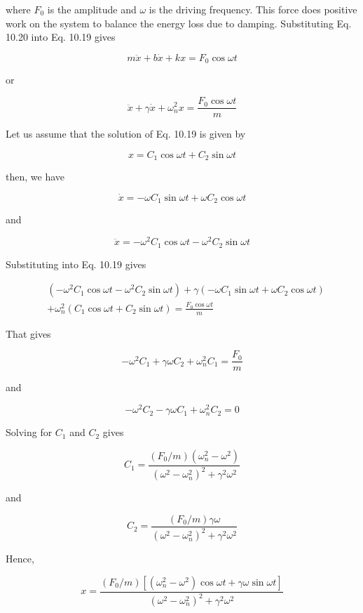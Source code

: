 \documentclass[10pt]{article}
\begin{document}
where $F_{0}$ is the amplitude and $\omega$ is the driving frequency. This force does positive work on the system to balance the energy loss due to damping. Substituting Eq. 10.20 into Eq. 10.19 gives


\begin{equation*}
m \ddot{x}+b \dot{x}+k x=F_{0} \cos \omega t \tag{10.21}
\end{equation*}


or

$$
\ddot{x}+\gamma \dot{x}+\omega_{n}^{2} x=\frac{F_{0} \cos \omega t}{m}
$$

Let us assume that the solution of Eq. 10.19 is given by

$$
x=C_{1} \cos \omega t+C_{2} \sin \omega t
$$

then, we have

$$
\dot{x}=-\omega C_{1} \sin \omega t+\omega C_{2} \cos \omega t
$$

and

$$
\ddot{x}=-\omega^{2} C_{1} \cos \omega t-\omega^{2} C_{2} \sin \omega t
$$

Substituting into Eq. 10.19 gives

$$
\begin{aligned}
& \left(-\omega^{2} C_{1} \cos \omega t-\omega^{2} C_{2} \sin \omega t\right)+\gamma\left(-\omega C_{1} \sin \omega t+\omega C_{2} \cos \omega t\right) \\
& +\omega_{n}^{2}\left(C_{1} \cos \omega t+C_{2} \sin \omega t\right)=\frac{F_{0} \cos \omega t}{m}
\end{aligned}
$$

That gives

$$
-\omega^{2} C_{1}+\gamma \omega C_{2}+\omega_{n}^{2} C_{1}=\frac{F_{0}}{m}
$$

and

$$
-\omega^{2} C_{2}-\gamma \omega C_{1}+\omega_{n}^{2} C_{2}=0
$$

Solving for $C_{1}$ and $C_{2}$ gives

$$
C_{1}=\frac{\left(F_{0} / m\right)\left(\omega_{n}^{2}-\omega^{2}\right)}{\left(\omega^{2}-\omega_{n}^{2}\right)^{2}+\gamma^{2} \omega^{2}}
$$

and

$$
C_{2}=\frac{\left(F_{0} / m\right) \gamma \omega}{\left(\omega^{2}-\omega_{n}^{2}\right)^{2}+\gamma^{2} \omega^{2}}
$$

Hence,

$$
x=\frac{\left(F_{0} / m\right)\left[\left(\omega_{n}^{2}-\omega^{2}\right) \cos \omega t+\gamma \omega \sin \omega t\right]}{\left(\omega^{2}-\omega_{n}^{2}\right)^{2}+\gamma^{2} \omega^{2}}
$$
\end{document}
